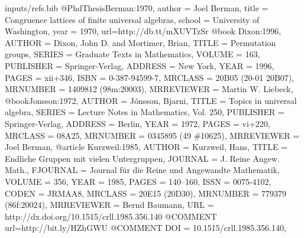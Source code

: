 \begin{filecontents*}{inputs/refs.bib}
  @PhdThesis{Berman:1970,
    author = 	 {Joel Berman},
    title = 	 {Congruence lattices of finite universal algebras},
    school = 	 {University of Washington},
    year = 	 {1970},
    url={http://db.tt/mXUVTzSr}
  }
  @book {Dixon:1996,
    AUTHOR = {Dixon, John D. and Mortimer, Brian},
    TITLE = {Permutation groups},
    SERIES = {Graduate Texts in Mathematics},
    VOLUME = {163},
    PUBLISHER = {Springer-Verlag},
    ADDRESS = {New York},
    YEAR = {1996},
    PAGES = {xii+346},
    ISBN = {0-387-94599-7},
    MRCLASS = {20B05 (20-01 20B07)},
    MRNUMBER = {1409812 (98m:20003)},
    MRREVIEWER = {Martin W. Liebeck},
  }
  @book{Jonsson:1972,
    AUTHOR = {J{\'o}nsson, Bjarni},
    TITLE = {Topics in universal algebra},
    SERIES = {Lecture Notes in Mathematics, Vol. 250},
    PUBLISHER = {Springer-Verlag},
    ADDRESS = {Berlin},
    YEAR = {1972},
    PAGES = {vi+220},
    MRCLASS = {08A25},
    MRNUMBER = {0345895 (49 \#10625)},
    MRREVIEWER = {Joel Berman},
  }
  @article {Kurzweil:1985,
    AUTHOR = {Kurzweil, Hans},
    TITLE = {Endliche {G}ruppen mit vielen {U}ntergruppen},
    JOURNAL = {J. Reine Angew. Math.},
    FJOURNAL = {Journal f\"ur die Reine und Angewandte Mathematik},
    VOLUME = {356},
    YEAR = {1985},
    PAGES = {140--160},
    ISSN = {0075-4102},
    CODEN = {JRMAA8},
    MRCLASS = {20E15 (20D30)},
    MRNUMBER = {779379 (86f:20024)},
    MRREVIEWER = {Bernd Baumann},
    URL = {http://dx.doi.org/10.1515/crll.1985.356.140}
  }
  @COMMENT url={http://bit.ly/HZhGWU}
  @COMMENT DOI = {10.1515/crll.1985.356.140},


\end{filecontents*}
